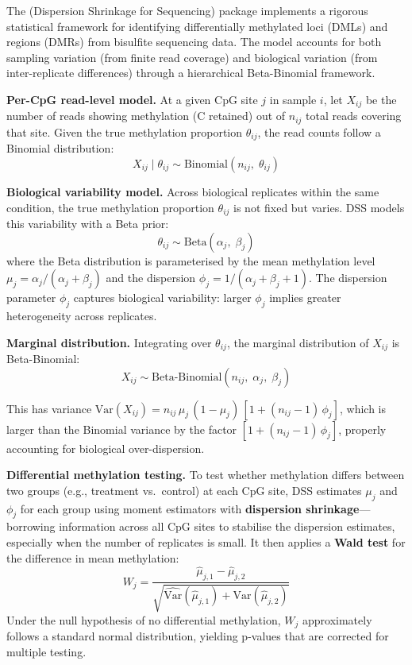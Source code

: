 The  (Dispersion Shrinkage for Sequencing) package implements a rigorous statistical framework for identifying differentially methylated loci (DMLs) and regions (DMRs) from bisulfite sequencing data. The model accounts for both sampling variation (from finite read coverage) and biological variation (from inter-replicate differences) through a hierarchical Beta-Binomial framework.

\textbf{Per-CpG read-level model.} At a given CpG site $j$ in sample $i$, let $X_{ij}$ be the number of reads showing methylation (C retained) out of $n_{ij}$ total reads covering that site. Given the true methylation proportion $\theta_{ij}$, the read counts follow a Binomial distribution:
\begin{equation}
\label{eq:methylation:dss-binomial}
X_{ij} \mid \theta_{ij} \sim \text{Binomial}(n_{ij},\; \theta_{ij})
\end{equation}

\textbf{Biological variability model.} Across biological replicates within the same condition, the true methylation proportion $\theta_{ij}$ is not fixed but varies. DSS models this variability with a Beta prior:
\begin{equation}
\label{eq:methylation:dss-beta}
\theta_{ij} \sim \text{Beta}(\alpha_j,\; \beta_j)
\end{equation}
where the Beta distribution is parameterised by the mean methylation level $\mu_j = \alpha_j / (\alpha_j + \beta_j)$ and the dispersion $\phi_j = 1/(\alpha_j + \beta_j + 1)$. The dispersion parameter $\phi_j$ captures biological variability: larger $\phi_j$ implies greater heterogeneity across replicates.

\textbf{Marginal distribution.} Integrating over $\theta_{ij}$, the marginal distribution of $X_{ij}$ is Beta-Binomial:
\begin{equation}
\label{eq:methylation:dss-betabinom}
X_{ij} \sim \text{Beta-Binomial}(n_{ij},\; \alpha_j,\; \beta_j)
\end{equation}

This has variance $\text{Var}(X_{ij}) = n_{ij}\,\mu_j\,(1-\mu_j)\,[1 + (n_{ij}-1)\,\phi_j]$, which is larger than the Binomial variance by the factor $[1 + (n_{ij}-1)\,\phi_j]$, properly accounting for biological over-dispersion.

\textbf{Differential methylation testing.} To test whether methylation differs between two groups (e.g., treatment vs.\ control) at each CpG site, DSS estimates $\mu_j$ and $\phi_j$ for each group using moment estimators with \textbf{dispersion shrinkage}---borrowing information across all CpG sites to stabilise the dispersion estimates, especially when the number of replicates is small. It then applies a \textbf{Wald test} for the difference in mean methylation:
\begin{equation}
\label{eq:methylation:dss-wald}
W_j = \frac{\hat{\mu}_{j,1} - \hat{\mu}_{j,2}}{\sqrt{\widehat{\text{Var}}(\hat{\mu}_{j,1}) + \widehat{\text{Var}}(\hat{\mu}_{j,2})}}
\end{equation}
Under the null hypothesis of no differential methylation, $W_j$ approximately follows a standard normal distribution, yielding p-values that are corrected for multiple testing.

